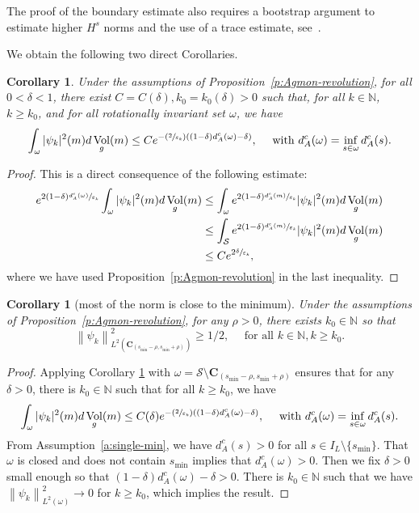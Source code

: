 \documentclass[11pt]{article}
\numberwithin{equation}{section}
\newcommand{\Psfrac}[2]{(\sfrac{#1}{#2})}
\newtheorem{corollary}[lemma]{Corollary}
\theoremstyle{definition}
\newcommand{\calS}{\ensuremath{\mathcal S}}
\newcommand{\mb}[1]{\ensuremath{\mathbb{#1}}}
\newcommand{\N}{{\mb{N}}}
\DeclareMathOperator{\Vol}{Vol}
\newcommand\bnp{\begin{proof}}
\newcommand\enp{\end{proof}}
\newcommand\nor[2]{\left\|#1\right\|_{#2}}
\newcommand{\ce}{c}
\let\e\varepsilon
\newcommand\CO[1]{\boldsymbol{C}_{\!#1}}
\begin{document}
The proof of the boundary estimate also requires a bootstrap argument to estimate higher $H^s$ norms and the use of a trace estimate, see~\cite[Prop.\,3.3.1 \&~3.3.4]{Helffer:booksemiclassic}.

We obtain the following two direct Corollaries.
\begin{corollary}
\label{coragmonfaible}
Under the assumptions of Proposition~\ref{p:Agmon-revolution}, for all $0<\delta< 1$, there exist $C=C(\delta),k_0=k_0(\delta)>0$ such that, for all $k \in \N$, $k \geq k_0$, and for all rotationally invariant set $\omega$, we have
\[
\int_{\omega} |\psi_k|^2(m) d\Vol_g(m)
\leq C e^{-\Psfrac{2}{\e_k} ((1-\delta)d_A^{\ce}(\omega) - \delta) }, \quad \text{ with } d_A^{\ce}(\omega) = \inf_{s\in \omega} d_A^{\ce}(s).
\]
\end{corollary}
\bnp
This is a direct consequence of the following estimate:
\begin{align*}
e^{2(1-\delta)\sfrac{ d_A^{\ce}(\omega)}{\e_k}} \int_{\omega} |\psi_k|^2(m) d\Vol_g(m) & \leq\int_{\omega} e^{2(1-\delta)\sfrac{ d_A^{\ce}(m)}{\e_k}} |\psi_k|^2(m) d\Vol_g(m) \\
& \leq \int_{\calS} e^{2(1-\delta)\sfrac{ d_A^{\ce}(m)}{\e_k}} |\psi_k|^2(m) d\Vol_g(m)\\
&\leq C e^{2\sfrac{\delta}{\e_k}},
\end{align*}
where we have used Proposition~\ref{p:Agmon-revolution} in the last inequality.
\enp
\begin{corollary}[most of the norm is close to the minimum]
\label{corpresx0}
Under the assumptions of Proposition~\ref{p:Agmon-revolution}, for any $\rho>0$, there exists $k_0\in \N$ so that
\[
\nor{\psi_k}{L^2(\CO{(s_{\min}-\rho, s_{\min} +\rho)})}^2\geq 1/2, \quad \text{ for all } k\in \N, k\geq k_0.
\]
\end{corollary}
\bnp
Applying Corollary \ref{coragmonfaible} with $\omega=\mathcal{S}\setminus\CO{(s_{\min}-\rho, s_{\min} +\rho)}$ ensures that for any $\delta>0$, there is $k_0\in \N$ such that for all $k\geq k_0$, we have
\[
\int_{\omega} |\psi_k|^2(m) d\Vol_g(m)
\leq C(\delta) e^{-\Psfrac{2}{\e_k} ((1-\delta)d_A^{\ce}(\omega) - \delta) }, \quad \text{ with } d_A^{\ce}(\omega) = \inf_{s\in \omega} d_A^{\ce}(s).
\]
From Assumption~\ref{a:single-min}, we have $d_A^{\ce}(s)>0$ for all $s \in I_L\setminus \{s_{\min}\}$. That $\omega$ is closed and does not contain $s_{\min}$ implies that $d_A^{\ce}(\omega)>0$.
Then we fix $\delta>0$ small enough so that $(1-\delta)d_A^{\ce}(\omega) - \delta>0$. There is $k_0\in \N$ such that we have $\nor{\psi_k}{L^2(\omega)}^2 \to 0$ for $k \geq k_0$, which implies the result.
\enp
\end{document}
